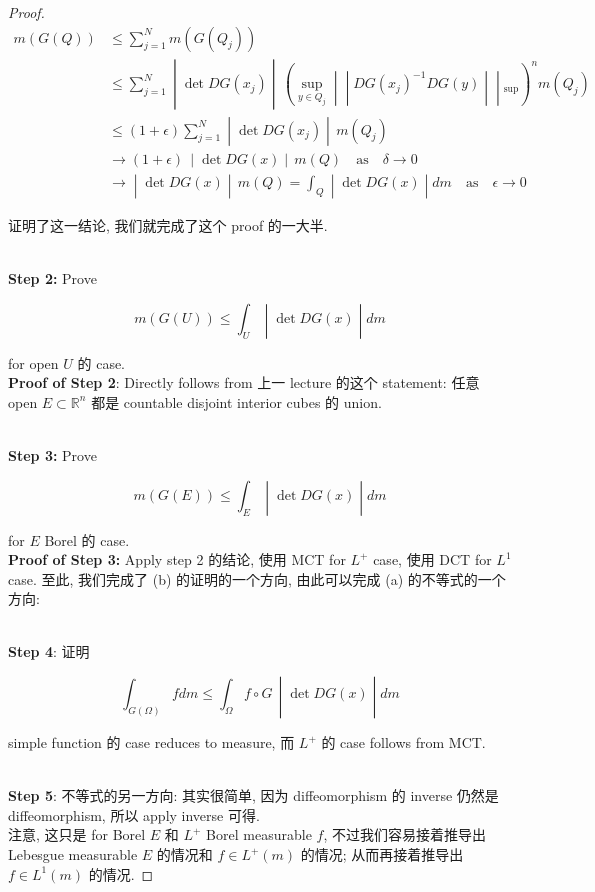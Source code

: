 \documentclass{qlnotes-export}
\begin{document}
\begin{proof}
\[\begin{matrix}
{m(G(Q))} & {\leq \sum\limits_{j = 1}^{N}m(G(Q_{j}))} \\
 & \left. \leq \sum\limits_{j = 1}^{N} \middle| \det DG(x_{j}) \middle| \,(\sup\limits_{y \in Q_{j}} \middle| \middle| DG(x_{j})^{- 1}DG(y) \middle| \middle| {}_{\sup})^{n}m(Q_{j}) \right. \\
 & \left. \leq (1 + \epsilon)\sum\limits_{j = 1}^{N} \middle| \det DG(x_{j}) \middle| \, m(Q_{j}) \right. \\
 & \left. \rightarrow(1 + \epsilon)\, \middle| \det DG(x) \middle| \, m(Q)\quad\text{as}\quad\delta\rightarrow 0 \right. \\
 & \left. \rightarrow \middle| \det DG(x) \middle| \, m(Q) = \int_{Q} \middle| \det DG(x) \middle| dm\quad\text{as}\quad\epsilon\rightarrow 0 \right.
\end{matrix}\]

证明了这一结论, 我们就完成了这个 proof 的一大半.\\
\strut \\
\textbf{Step 2:} Prove

\[\left. m(G(U)) \leq \int_{U} \middle| \det DG(x) \middle| dm \right.\]

for open \(U\) 的 case.\\
\textbf{Proof of Step 2}: Directly follows from 上一 lecture 的这个 statement: 任意 open \(E \subset {\mathbb{R}}^{n}\) 都是 countable disjoint interior cubes 的 union.\\
\strut \\
\textbf{Step 3:} Prove

\[\left. m(G(E)) \leq \int_{E} \middle| \det DG(x) \middle| dm \right.\]

for \(E\) Borel 的 case.\\
\textbf{Proof of Step 3:} Apply step 2 的结论, 使用 MCT for \(L^{+}\) case, 使用 DCT for \(L^{1}\) case. 至此, 我们完成了 (b) 的证明的一个方向, 由此可以完成 (a) 的不等式的一个方向:\\
\strut \\
\textbf{Step 4}: 证明

\[\left. \int_{G(\Omega)}f dm \leq \int_{\Omega}f \circ G\, \middle| \det DG(x) \middle| dm \right.\]

simple function 的 case reduces to measure, 而 \(L^{+}\) 的 case follows from MCT.\\
\strut \\
\textbf{Step 5}: 不等式的另一方向: 其实很简单, 因为 diffeomorphism 的 inverse 仍然是 diffeomorphism, 所以 apply inverse 可得.\\
注意, 这只是 for Borel \(E\) 和 \(L^{+}\) Borel measurable \(f\), 不过我们容易接着推导出 Lebesgue measurable \(E\) 的情况和 \(f \in L^{+}(m)\) 的情况; 从而再接着推导出 \(f \in L^{1}(m)\) 的情况.

\end{proof}
\end{document}
